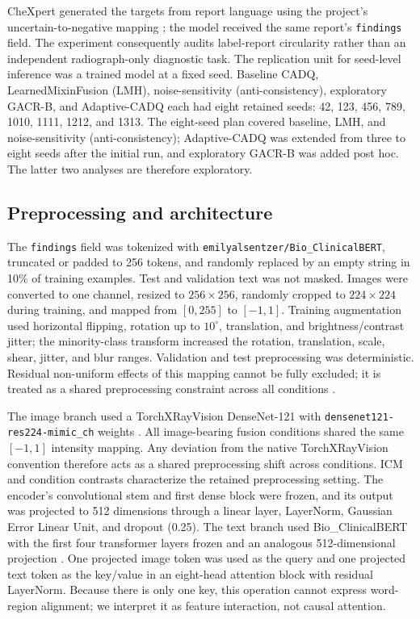 \documentclass[a4paper,fleqn]{cas-sc}
\begin{document}
CheXpert generated the targets from report language using the project's
uncertain-to-negative mapping \cite{irvin2019chexpert}; the model received the
same report's \texttt{findings} field. The experiment consequently audits
label-report circularity rather than an independent radiograph-only diagnostic
task. The replication unit for seed-level inference was a trained model at a
fixed seed. Baseline CADQ, LearnedMixinFusion (LMH), noise-sensitivity
(anti-consistency), exploratory GACR-B, and Adaptive-CADQ each had eight
retained seeds: 42, 123, 456, 789, 1010, 1111, 1212, and 1313. The eight-seed
plan covered baseline, LMH, and noise-sensitivity (anti-consistency);
Adaptive-CADQ was extended from three to eight seeds after the initial run, and
exploratory GACR-B was added post hoc. The latter two analyses are
therefore exploratory.

\subsection{Preprocessing and architecture}\label{sec:architecture}

The \texttt{findings} field was tokenized with
\texttt{emilyalsentzer/Bio\_ClinicalBERT}, truncated or padded to 256 tokens,
and randomly replaced by an empty string in 10\% of training examples. Test and
validation text was not masked. Images were converted to one channel, resized
to $256\times256$, randomly cropped to $224\times224$ during training, and
mapped from $[0,255]$ to $[-1,1]$. Training augmentation used horizontal
flipping, rotation up to $10^{\circ}$, translation, and brightness/contrast
jitter; the minority-class transform increased the rotation, translation,
scale, shear, jitter, and blur ranges. Validation and test preprocessing was
deterministic. Residual non-uniform effects of this mapping cannot be fully
excluded; it is treated as a shared preprocessing constraint across all
conditions \cite{cohen2022torchxrayvision}.

The image branch used a TorchXRayVision DenseNet-121 with
\texttt{densenet121-res224-mimic\_ch} weights
\cite{huang2017densenet,cohen2022torchxrayvision}. All image-bearing fusion
conditions shared the same $[-1,1]$ intensity mapping. Any deviation from the
native TorchXRayVision convention therefore acts as a shared preprocessing
shift across conditions. ICM and condition contrasts characterize the retained
preprocessing setting.
The encoder's convolutional stem and
first dense block were frozen, and its output was projected to 512 dimensions
through a linear layer, LayerNorm, Gaussian Error Linear Unit, and dropout
(0.25). The text branch used Bio\_ClinicalBERT with the first four transformer
layers frozen and an analogous 512-dimensional projection
\cite{devlin2019bert,alsentzer2019clinicalbert}. One projected image token was
used as the query and one projected text token as the key/value in an eight-head
attention block with residual LayerNorm. Because there is only one key, this
operation cannot express word-region alignment; we interpret it as feature
interaction, not causal attention.
\end{document}
